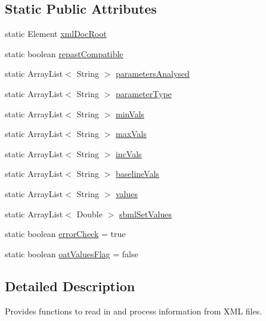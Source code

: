 \subsection*{Static Public Attributes}
\begin{DoxyCompactItemize}
\item 
static Element \hyperlink{classxmlFileUtilities_1_1XMLFileUtilities_a936db354ec5ded79b915e60aa81ef757}{xml\+Doc\+Root}
\item 
static boolean \hyperlink{classxmlFileUtilities_1_1XMLFileUtilities_ac1cd9779fc740585e585498ab598a573}{repast\+Compatible}
\item 
static Array\+List$<$ String $>$ \hyperlink{classxmlFileUtilities_1_1XMLFileUtilities_aec3cff4dd69b480894a8d3f78d414791}{parameters\+Analysed}
\item 
static Array\+List$<$ String $>$ \hyperlink{classxmlFileUtilities_1_1XMLFileUtilities_a5c6314af241e98f0701b3694e364e27e}{parameter\+Type}
\item 
static Array\+List$<$ String $>$ \hyperlink{classxmlFileUtilities_1_1XMLFileUtilities_a20c1b1d6bf709a9e1aea4cc7e38ec2fe}{min\+Vals}
\item 
static Array\+List$<$ String $>$ \hyperlink{classxmlFileUtilities_1_1XMLFileUtilities_a6db58012fe79cf36d772eda6fc4aa484}{max\+Vals}
\item 
static Array\+List$<$ String $>$ \hyperlink{classxmlFileUtilities_1_1XMLFileUtilities_aff7782e4e87133c300f459f956acdacf}{inc\+Vals}
\item 
static Array\+List$<$ String $>$ \hyperlink{classxmlFileUtilities_1_1XMLFileUtilities_a29f06ee2eff3920a793bf1418e04375b}{baseline\+Vals}
\item 
static Array\+List$<$ String $>$ \hyperlink{classxmlFileUtilities_1_1XMLFileUtilities_af7660bd6cf5d1988e53ebdacfda88565}{values}
\item 
static Array\+List$<$ Double $>$ \hyperlink{classxmlFileUtilities_1_1XMLFileUtilities_a74e7bbbaf59c27ca16b4d2696b1a7a57}{sbml\+Set\+Values}
\item 
static boolean \hyperlink{classxmlFileUtilities_1_1XMLFileUtilities_a9d2c9fb596b4f8c0fff694f78259d786}{error\+Check} = true
\item 
static boolean \hyperlink{classxmlFileUtilities_1_1XMLFileUtilities_ae10435eb2f2b4c128b4c658edc8fa2e9}{oat\+Values\+Flag} = false
\end{DoxyCompactItemize}


\subsection{Detailed Description}
Provides functions to read in and process information from X\+M\+L files. 

